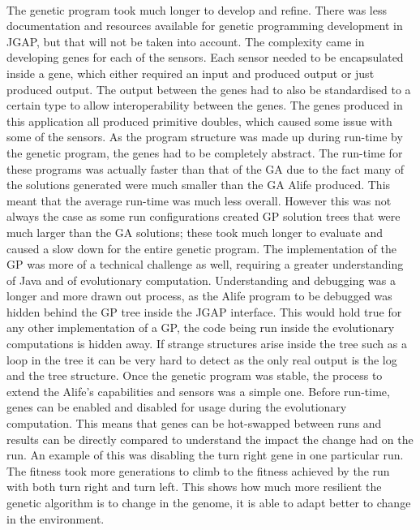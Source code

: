 \documentclass[12pt]{article}
\begin{document}
\paragraph{}
The genetic program took much longer to develop and refine. There was less documentation and resources available for genetic programming 
development in JGAP, but that will not be taken into account. The complexity came in developing genes for each of the sensors. Each sensor
needed to be encapsulated inside a gene, which either required an input and produced output or just produced output. The output between
the genes had to also be standardised to a certain type to allow interoperability between the genes. The genes produced in this application
all produced primitive doubles, which caused some issue with some of the sensors. As the program structure was made up during run-time by
the genetic program, the genes had to be completely abstract. The run-time for these programs was actually faster than that of the GA due
to the fact many of the solutions generated were much smaller than the GA Alife produced. This meant that the average run-time was much 
less overall. However this was not always the case as some run configurations created GP solution trees that were much larger than the 
GA solutions; these took much longer to evaluate and caused a slow down for the entire genetic program. The implementation of the GP was 
more of a technical challenge as well, requiring a greater understanding of Java and of evolutionary computation. Understanding and debugging
was a longer and more drawn out process, as the Alife program to be debugged was hidden behind the GP tree inside the JGAP interface.
This would hold true for any other implementation of a GP, the code being run inside the evolutionary computations is hidden away. If strange
structures arise inside the tree such as a loop in the tree it can be very hard to detect as the only real output is the log and
the tree structure. Once the genetic program was stable, the process to extend the Alife's capabilities and sensors was a simple one. Before
run-time, genes can be enabled and disabled for usage during the evolutionary computation. This means that genes can be hot-swapped between
runs and results can be directly compared to understand the impact the change had on the run. An example of this was disabling the turn
right gene in one particular run. The fitness took more generations to climb to the fitness achieved by the run with both turn right and
turn left. This shows how much more resilient the genetic algorithm is to change in the genome, it is able to adapt better to change in
the environment.
\end{document}
